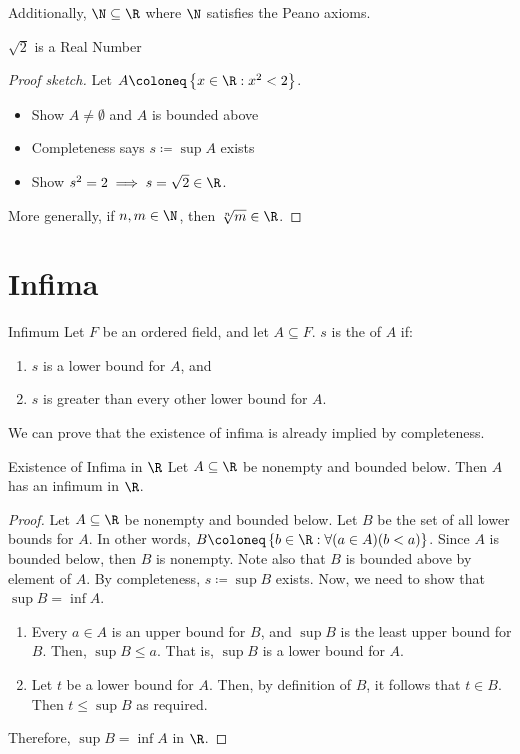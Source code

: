 Additionally, $\N \subseteq \R$ where $\N$ satisfies the Peano axioms.

\begin{thmbox}{$\sqrt{2}$ is a Real Number}{}
    \begin{proof}[Proof sketch]
        Let $A \coloneq \left\{ x \in \R : x^2 < 2 \right\}$.
        \begin{itemize}[noitemsep]
            \item Show $A \neq \emptyset$ and $A$ is bounded above
            \item Completeness says $s \coloneq \sup A$ exists
            \item Show $s^2 = 2 \implies s = \sqrt{2} \in \R$.
        \end{itemize}
        More generally, if $n,m \in \N$, then $\sqrt[n]{m} \in \R$.
    \end{proof}
\end{thmbox}

\section{Infima}
\begin{dfnbox}{Infimum}{}
    Let $F$ be an ordered field, and let $A \subseteq F$. $s$ is the  of $A$ if:
    \begin{enumerate}[noitemsep]
        \item $s$ is a lower bound for $A$, and
        \item $s$ is greater than every other lower bound for $A$.
    \end{enumerate}
\end{dfnbox}

We can prove that the existence of infima is already implied by completeness.

\begin{thmbox}{Existence of Infima in $\R$}{}
    Let $A \subseteq \R$ be nonempty and bounded below. Then $A$ has an infimum in $\R$.
    \tcblower
    \begin{proof}
        Let $A \subseteq \R$ be nonempty and bounded below. Let $B$ be the set of all lower bounds for $A$. In other words, $B \coloneq \left\{ b \in \R : \forall(a \in A)(b < a) \right\}$. Since $A$ is bounded below, then $B$ is nonempty. Note also that $B$ is bounded above by element of $A$. By completeness, $s \coloneq \sup B$ exists. Now, we need to show that $\sup B = \inf A$.
        \begin{enumerate}
            \item Every $a \in A$ is an upper bound for $B$, and $\sup B$ is the least upper bound for $B$. Then, $\sup B \leq a$. That is, $\sup B$ is a lower bound for $A$.
            \item Let $t$ be a lower bound for $A$. Then, by definition of $B$, it follows that $t \in B$. Then $t \leq \sup B$ as required.
        \end{enumerate}
        Therefore, $\sup B = \inf A$ in $\R$.
    \end{proof}
\end{thmbox}

